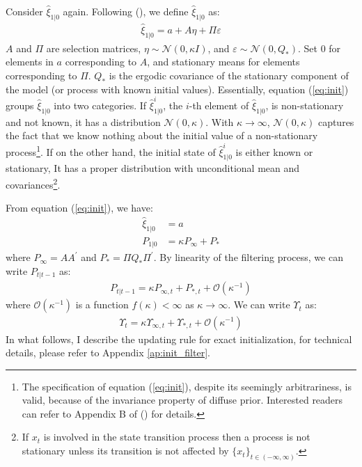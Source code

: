 \documentclass[10pt, titlepage]{article}
\numberwithin{equation}{section}
\begin{document}
Consider $\hat{\xi}_{1|0}$ again. Following (\cite{koopman_1997}), we define $\hat{\xi}_{1|0}$ as:
\begin{align}
    \hat{\xi}_{1|0} = a + A\eta + \Pi\varepsilon \label{eq:init}
\end{align}
$A$ and $\Pi$ are selection matrices, $\eta\sim\mathcal{N}(0,\kappa I)$, and $\varepsilon\sim\mathcal{N}(0,Q_{*})$. Set $0$ for elements in $a$ corresponding to $A$, and stationary means for elements corresponding to $\Pi$. $Q_{*}$ is the ergodic covariance of the stationary component of the model (or process with known initial values). Essentially, equation (\ref{eq:init}) groups $\hat{\xi}_{1|0}$ into two categories. If $\hat{\xi}_{1|0}^i$, the $i$-th element of $\hat{\xi}_{1|0}$, is non-stationary and not known, it has a distribution $\mathcal{N}(0, \kappa)$. With $\kappa\rightarrow\infty$, $\mathcal{N}(0,\kappa)$ captures the fact that we know nothing about the initial value of a non-stationary process\footnote{The specification of equation (\ref{eq:init}), despite its seemingly arbitrariness, is valid, because of the invariance property of diffuse prior. Interested readers can refer to Appendix B of (\cite{doan_2010}) for details.}. If on the other hand, the initial state of $\hat{\xi}_{1|0}^i$ is either known or stationary, It has a proper distribution with unconditional mean and covariances\footnote{If $x_t$ is involved in the state transition process then a process is not stationary unless its transition is not affected by $\{x_t\}_{t\in(-\infty,\infty)}$.}. 

From equation (\ref{eq:init}), we have:
\begin{align}
    \hat{\xi}_{1|0} &= a  \label{eq:init_xi}\\
    P_{1|0} &= \kappa P_{\infty} + P_{*} \label{eq:init_P}
\end{align}
where $P_{\infty}=AA^{'}$ and $P_{*}=\Pi Q_* \Pi^{'}$. By linearity of the filtering process, we can write $P_{t|t-1}$ as:
\begin{align}
    P_{t|t-1} = \kappa P_{\infty,t} + P_{*,t} + \mathcal{O}(\kappa^{-1}) \label{eq:P_diffuse}
\end{align}
where $\mathcal{O}(\kappa^{-1})$ is a function $f(\kappa)<\infty$ as $\kappa\rightarrow\infty$. We can write $\Upsilon_{t}$ as:
\begin{align*}
    \Upsilon_t = \kappa\Upsilon_{\infty,t} + \Upsilon_{*,t} + \mathcal{O}(\kappa^{-1})
\end{align*}
In what follows, I describe the updating rule for exact initialization, for technical details, please refer to Appendix \ref{ap:init_filter}.
\end{document}

